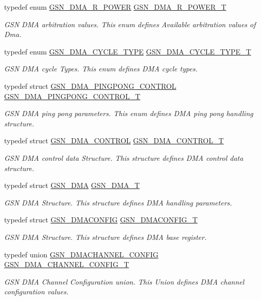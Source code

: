 \begin{DoxyCompactItemize}
typedef enum \hyperlink{a00645_ga0dab047350d5c343038b0c017077dab7}{GSN\_\-DMA\_\-R\_\-POWER} \hyperlink{a00645_gadf8a8e2066de9043a495c7764612c35f}{GSN\_\-DMA\_\-R\_\-POWER\_\-T}
\begin{DoxyCompactList}\small\item\em GSN DMA arbitration values. This enum defines Available arbitration values of Dma. \end{DoxyCompactList}\item 
typedef enum \hyperlink{a00645_ga05b9b2e87ca35c2d0564ceca307d349c}{GSN\_\-DMA\_\-CYCLE\_\-TYPE} \hyperlink{a00645_gab5fced5a7e633077a493c6353edef6de}{GSN\_\-DMA\_\-CYCLE\_\-TYPE\_\-T}
\begin{DoxyCompactList}\small\item\em GSN DMA cycle Types. This enum defines DMA cycle types. \end{DoxyCompactList}\item 
typedef struct \hyperlink{a00051}{GSN\_\-DMA\_\-PINGPONG\_\-CONTROL} \hyperlink{a00645_gae146d7793ab9cfe1a37249ffc98ccf5d}{GSN\_\-DMA\_\-PINGPONG\_\-CONTROL\_\-T}
\begin{DoxyCompactList}\small\item\em GSN DMA ping pong parameters. This enum defines DMA ping pong handling structure. \end{DoxyCompactList}\item 
typedef struct \hyperlink{a00050}{GSN\_\-DMA\_\-CONTROL} \hyperlink{a00645_gad93c4855c9b915891cbdcfcdf2fd0ee5}{GSN\_\-DMA\_\-CONTROL\_\-T}
\begin{DoxyCompactList}\small\item\em GSN DMA control data Structure. This structure defines DMA control data structure. \end{DoxyCompactList}\item 
typedef struct \hyperlink{a00049}{GSN\_\-DMA} \hyperlink{a00645_ga61edafecbc46e3ba81ec48b9cf3aa1fa}{GSN\_\-DMA\_\-T}
\begin{DoxyCompactList}\small\item\em GSN DMA Structure. This structure defines DMA handling parameters. \end{DoxyCompactList}\item 
typedef struct \hyperlink{a00053}{GSN\_\-DMACONFIG} \hyperlink{a00645_ga64a1083039794c33e6a904f799f730c5}{GSN\_\-DMACONFIG\_\-T}
\begin{DoxyCompactList}\small\item\em GSN DMA Structure. This structure defines DMA base register. \end{DoxyCompactList}\item 
typedef union \hyperlink{a00052}{GSN\_\-DMACHANNEL\_\-CONFIG} \hyperlink{a00645_ga39663b303d8a6ba93086369a284e1334}{GSN\_\-DMA\_\-CHANNEL\_\-CONFIG\_\-T}
\begin{DoxyCompactList}\small\item\em GSN DMA Channel Configuration union. This Union defines DMA channel configuration values. \end{DoxyCompactList}\end{DoxyCompactItemize}
